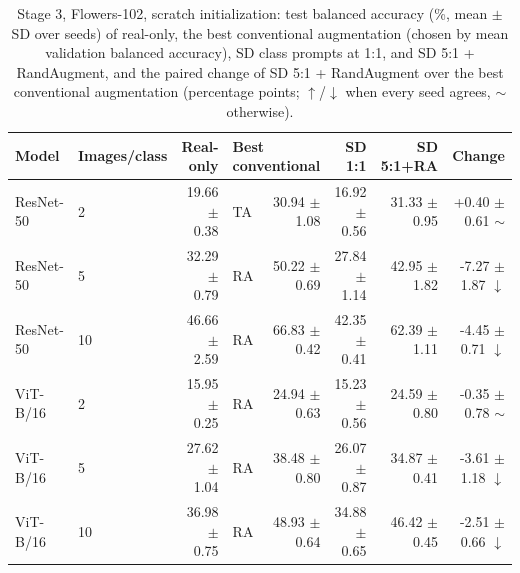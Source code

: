 \begin{table}[H]
\centering
\small
\setlength{\tabcolsep}{4pt}
\caption{Stage 3, Flowers-102, scratch initialization: test balanced accuracy (\%, mean $\pm$ SD over seeds) of real-only, the best conventional augmentation (chosen by mean validation balanced accuracy), SD class prompts at 1:1, and SD 5:1 + RandAugment, and the paired change of SD 5:1 + RandAugment over the best conventional augmentation (percentage points; $\uparrow$/$\downarrow$ when every seed agrees, $\sim$ otherwise).}
\label{tab:stage3-flowers102-scores-scratch-test}
\begin{tabular}{llrlrrrr}
\toprule
Model & Images/class & Real-only & \multicolumn{2}{l}{Best conventional} & SD 1:1 & SD 5:1+RA & Change \\
\midrule
ResNet-50 & 2 & 19.66 $\pm$ 0.38 & TA & 30.94 $\pm$ 1.08 & 16.92 $\pm$ 0.56 & 31.33 $\pm$ 0.95 & +0.40 $\pm$ 0.61 $\sim$ \\
ResNet-50 & 5 & 32.29 $\pm$ 0.79 & RA & 50.22 $\pm$ 0.69 & 27.84 $\pm$ 1.14 & 42.95 $\pm$ 1.82 & -7.27 $\pm$ 1.87 $\downarrow$ \\
ResNet-50 & 10 & 46.66 $\pm$ 2.59 & RA & 66.83 $\pm$ 0.42 & 42.35 $\pm$ 0.41 & 62.39 $\pm$ 1.11 & -4.45 $\pm$ 0.71 $\downarrow$ \\
ViT-B/16 & 2 & 15.95 $\pm$ 0.25 & RA & 24.94 $\pm$ 0.63 & 15.23 $\pm$ 0.56 & 24.59 $\pm$ 0.80 & -0.35 $\pm$ 0.78 $\sim$ \\
ViT-B/16 & 5 & 27.62 $\pm$ 1.04 & RA & 38.48 $\pm$ 0.80 & 26.07 $\pm$ 0.87 & 34.87 $\pm$ 0.41 & -3.61 $\pm$ 1.18 $\downarrow$ \\
ViT-B/16 & 10 & 36.98 $\pm$ 0.75 & RA & 48.93 $\pm$ 0.64 & 34.88 $\pm$ 0.65 & 46.42 $\pm$ 0.45 & -2.51 $\pm$ 0.66 $\downarrow$ \\
\bottomrule
\end{tabular}
\end{table}
